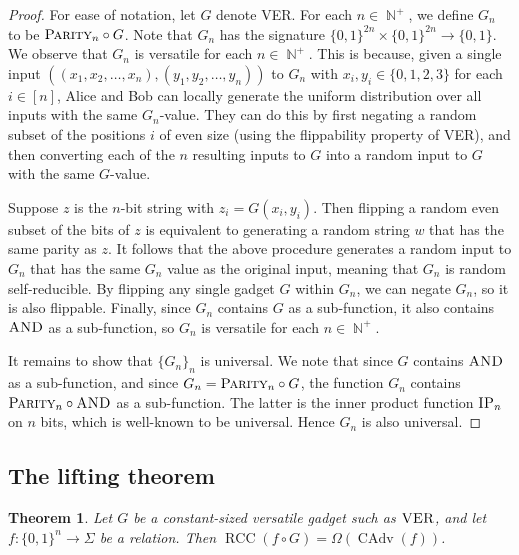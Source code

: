 \documentclass[10pt,a4paper]{article}
\newtheorem{theorem}{Theorem}
\theoremstyle{definition}
\newcommand{\B}{\{0,1\}}
\renewcommand{\>}{\rangle}
\newcommand{\<}{\langle}
\DeclareMathOperator{\bN}{\mathbb{N}}
\newcommand{\AND}{\textsc{AND}}
\newcommand{\PARITY}{\textsc{Parity}}
\newcommand{\IP}{\textsc{IP}}
\DeclareMathOperator{\CAdv}{CAdv}
\DeclareMathOperator{\RCC}{RCC}
\begin{document}
\begin{proof}
For ease of notation, let $G$ denote \textsc{VER}.
For each $n\in\bN^+$, we define $G_{n}$ to be
$\PARITY_n\circ G$. Note that $G_{n}$ has the signature
$\B^{2n}\times\B^{2n}\to\B$. We observe that $G_{n}$
is versatile for each $n\in\bN^{+}$. This is because,
given a single input $((x_1,x_2,\dots,x_n),(y_1,y_2,\dots,y_n))$
to $G_{n}$ with $x_i,y_i\in\{0,1,2,3\}$ for each $i\in[n]$,
Alice and Bob can locally generate the uniform
distribution over all inputs with the same $G_{n}$-value.
They can do this by first negating a random subset of the
positions $i$ of even size
(using the flippability property of \textsc{VER}),
and then converting each of the $n$ resulting inputs to $G$
into a random input to $G$ with the same $G$-value.

Suppose $z$ is the $n$-bit string with $z_i=G(x_i,y_i)$.
Then flipping a random even subset of the bits of $z$
is equivalent to generating a random string $w$ that has
the same parity as $z$. It follows that the above procedure
generates a random input to $G_{n}$ that has the same $G_{n}$
value as the original input, meaning that $G_{n}$
is random self-reducible. By flipping any single gadget
$G$ within $G_{n}$, we can negate $G_n$, so it is also
flippable. Finally, since $G_n$ contains $G$ as a sub-function,
it also contains $\AND$ as a sub-function, so $G_n$
is versatile for each $n\in\bN^{+}$.

It remains to show that $\{G_n\}_n$ is universal.
We note that since $G$ contains $\AND$ as a sub-function,
and since $G_n=\PARITY_n\circ G$, the function $G_n$
contains $\PARITY_n\circ\AND$ as a sub-function. The latter
is the inner product function $\IP_n$ on $n$ bits,
which is well-known to be universal. Hence $G_n$ is also
universal.
\end{proof}


\subsection{The lifting theorem}

\begin{theorem}
Let $G$ be a constant-sized versatile gadget such as
$\textsc{VER}$, and let $f\colon\B^n\to\Sigma$ be a relation.
Then $\RCC(f\circ G) =\Omega(\CAdv(f))$.
\end{theorem}
\end{document}
